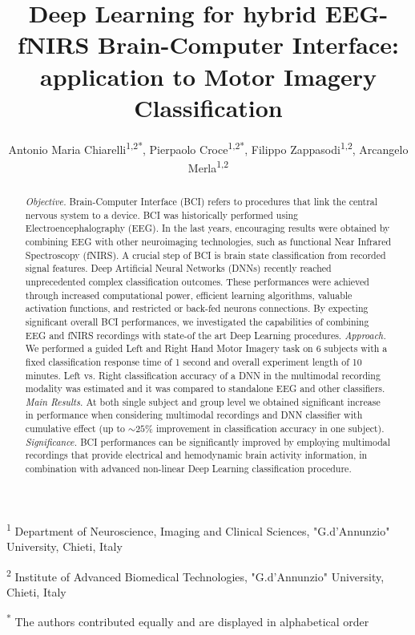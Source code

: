 \documentclass[12pt ]{iopart}
\begin{document}
\title[DNN for EEG-fNIRS BCI]{Deep Learning for  hybrid EEG-fNIRS Brain-Computer Interface: application to Motor Imagery Classification}

\author{Antonio Maria Chiarelli\textsuperscript{1,2*}, Pierpaolo Croce\textsuperscript{1,2*}, Filippo Zappasodi\textsuperscript{1,2}, Arcangelo Merla\textsuperscript{1,2}}

\vspace{10pt}
\begin{indented}
\item[] \textsuperscript{1} Department of Neuroscience, Imaging and Clinical Sciences, "G.d’Annunzio" University, Chieti, Italy
\item[] \textsuperscript{2} Institute of Advanced Biomedical Technologies, "G.d’Annunzio" University, Chieti, Italy
\item[] \textsuperscript{*} The authors contributed equally and are displayed in alphabetical order
\end{indented}

\begin{abstract}
	\textit{Objective.} Brain-Computer Interface (BCI) refers to procedures that link the central nervous system to a device.  BCI was historically performed using Electroencephalography (EEG). In the last years, encouraging results were obtained by combining EEG with other neuroimaging technologies, such as functional Near Infrared Spectroscopy (fNIRS). A crucial step of BCI is brain state classification from recorded signal features. Deep Artificial Neural Networks (DNNs) recently reached unprecedented complex classification outcomes. These performances were achieved through increased computational power, efficient learning algorithms, valuable activation functions, and restricted or back-fed neurons connections. By expecting significant overall BCI performances, we investigated the capabilities of combining EEG and fNIRS recordings with state-of the art Deep Learning procedures.
	\textit{Approach.} We performed a guided Left and Right Hand Motor Imagery task on 6 subjects with a fixed classification response time of 1 second and overall experiment length of 10 minutes. Left vs. Right classification accuracy of a DNN in the multimodal recording modality was estimated and it was compared to standalone EEG and other classifiers.
	\textit{Main Results.} At both single subject and group level we obtained significant increase in performance when considering multimodal recordings and DNN classifier with cumulative effect (up to $\sim25\%$ improvement in classification accuracy in one subject).
	\textit{Significance.} BCI performances can be significantly improved by employing multimodal recordings that provide electrical and hemodynamic brain activity information, in combination with advanced non-linear Deep Learning classification procedure.
\end{abstract}
\end{document}
